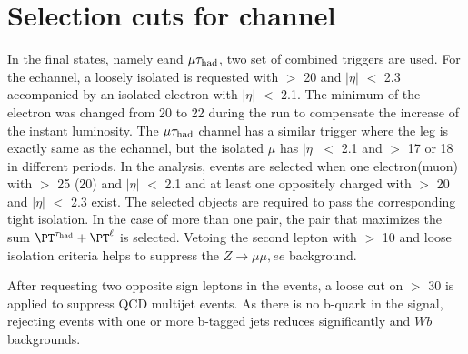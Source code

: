 \section{\texorpdfstring{Selection cuts for \leptonTau channel}{Selection cuts for lepton-tau channel}}
\label{sect:eleTauCuts}
In the \leptonTau final states, namely e\Tau and $\mu\tau_{\rm had}$,
two set of combined triggers are used. For the e\Tau channel, a loosely isolated \Tau is requested with \PT $>$ 20 \GeV and $|\eta|$ $<$ 2.3 
accompanied by an isolated electron with $|\eta|$ $<$ 2.1. The minimum \PT of the electron was changed from  20 to  22 \GeV 
during the run to compensate the increase of the instant luminosity.
The $\mu\tau_{\rm had}$ channel has a similar trigger where the \Tau leg is exactly same as the e\Tau channel, but the  isolated $\mu$  
has $|\eta|$ $<$ 2.1 and \PT $>$  17 or 18 \GeV in different periods. 
In the analysis, events are selected when one electron(muon) with \PT $>$ 25 (20) \GeV and $|\eta|$ $<$ 2.1 and at least 
one oppositely charged \Tau with \PT $>$ 20 \GeV and $|\eta|$ $<$ 2.3 exist. %
The selected objects are required to pass the corresponding tight isolation.
In the case of more than one pair, the pair that maximizes the sum $\PT^{\Tau} + \PT^{\ell}$ is selected.
Vetoing the second lepton with \PT $>$ 10 \GeV and loose isolation criteria helps to suppress the $Z\rightarrow \mu\mu, ee$ background.

After requesting two opposite sign leptons in the events, a loose cut on \MET $>$ 30 \GeV is applied to suppress QCD multijet events. 
As there is no b-quark in the signal, rejecting events with one or more b-tagged jets reduces significantly \ttbar and $Wb$ backgrounds.

